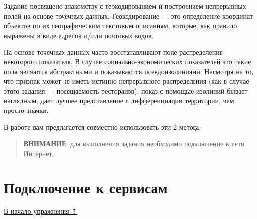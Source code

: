 \documentclass[]{book}
\theoremstyle{definition}
\theoremstyle{definition}
\theoremstyle{definition}
\theoremstyle{remark}
\begin{document}
Задание посвящено знакомству с геокодированием и построением непрерывных
полей на основе точечных данных. Геокодирование --- это определение
координат объектов по их географическим текстовым описаниям, которые,
как правило, выражены в виде адресов и/или почтовых кодов.

На основе точечных данных часто восстанавливают поле распределения
некоторого показателя. В случае социально-экономических показателей это
такие поля являются абстрактными и показываются псевдоизолиниями.
Несмотря на то, что признак может не иметь истинно непрерывного
распределения (как в случае этого задания --- посещаемость ресторанов),
показ с помощью изолиний бывает наглядным, дает лучшее представление о
дифференциации территории, чем просто значки.

В работе вам предлагается совместно использовать эти 2 метода.

\begin{quote}
\textbf{ВНИМАНИЕ}: для выполнения задания необходимо подключение к сети
Интернет.
\end{quote}

\hypertarget{geocoding-connection}{%
\section{Подключение к сервисам}\label{geocoding-connection}}

\protect\hyperlink{geocoding}{В начало упражнения ⇡}
\end{document}
